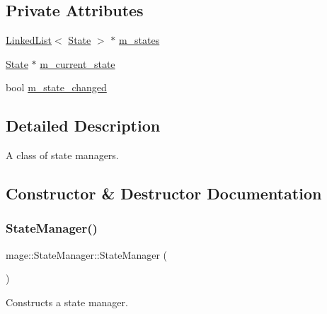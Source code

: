\subsection*{Private Attributes}
\begin{DoxyCompactItemize}
\item 
\hyperlink{classmage_1_1_linked_list}{Linked\+List}$<$ \hyperlink{classmage_1_1_state}{State} $>$ $\ast$ \hyperlink{classmage_1_1_state_manager_a88d005af690874d3ed3b8d4600525b9c}{m\+\_\+states}
\item 
\hyperlink{classmage_1_1_state}{State} $\ast$ \hyperlink{classmage_1_1_state_manager_a737122d580b709e0d122db4a6e1d9006}{m\+\_\+current\+\_\+state}
\item 
bool \hyperlink{classmage_1_1_state_manager_a8e905ec2358a18a5b56d44cf79799afa}{m\+\_\+state\+\_\+changed}
\end{DoxyCompactItemize}


\subsection{Detailed Description}
A class of state managers. 

\subsection{Constructor \& Destructor Documentation}
\hypertarget{classmage_1_1_state_manager_a6c4504d0b50fe671299b080f3be30c8e}{}\label{classmage_1_1_state_manager_a6c4504d0b50fe671299b080f3be30c8e} 
\subsubsection{\texorpdfstring{State\+Manager()}{StateManager()}}
{\footnotesize\ttfamily mage\+::\+State\+Manager\+::\+State\+Manager (\begin{DoxyParamCaption}{ }\end{DoxyParamCaption})}

Constructs a state manager. \hypertarget{classmage_1_1_state_manager_af4bc45cc90437f54e2776e2a8ee747e1}{}\label{classmage_1_1_state_manager_af4bc45cc90437f54e2776e2a8ee747e1} 
